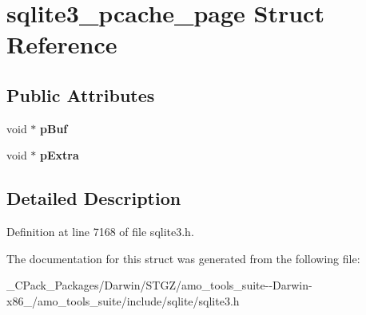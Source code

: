 \hypertarget{structsqlite3__pcache__page}{}\section{sqlite3\+\_\+pcache\+\_\+page Struct Reference}
\label{structsqlite3__pcache__page}
\subsection*{Public Attributes}
\begin{DoxyCompactItemize}
\item 
\mbox{\label{structsqlite3__pcache__page_aa5446325077c05e4b242c8e2d0faba3b}} 
void $\ast$ {\bfseries p\+Buf}
\item 
\mbox{\label{structsqlite3__pcache__page_a96d7b0314d02837dd6a5e7057912f74f}} 
void $\ast$ {\bfseries p\+Extra}
\end{DoxyCompactItemize}


\subsection{Detailed Description}


Definition at line 7168 of file sqlite3.\+h.



The documentation for this struct was generated from the following file\+:\begin{DoxyCompactItemize}
\item 
\+\_\+\+C\+Pack\+\_\+\+Packages/\+Darwin/\+S\+T\+G\+Z/amo\+\_\+tools\+\_\+suite-\/-\/\+Darwin-\/x86\+\_/amo\+\_\+tools\+\_\+suite/include/sqlite/sqlite3.\+h\end{DoxyCompactItemize}
